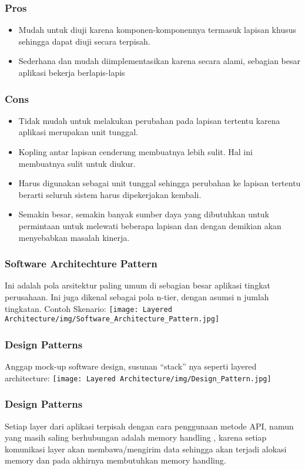 \documentclass{beamer}
\begin{document}
\begin{frame}
\frametitle{Pros}
\begin{itemize}
	\item Mudah untuk diuji karena komponen-komponennya termasuk lapisan khusus sehingga dapat diuji secara terpisah.
	\item Sederhana dan mudah diimplementasikan karena secara alami, sebagian besar aplikasi bekerja berlapis-lapis
\end{itemize}
\end{frame}

\begin{frame}
\frametitle{Cons}
\begin{itemize}
	\item Tidak mudah untuk melakukan perubahan pada lapisan tertentu karena aplikasi merupakan unit tunggal.
	\item Kopling antar lapisan cenderung membuatnya lebih sulit. Hal ini membuatnya sulit untuk diukur.
	\item Harus digunakan sebagai unit tunggal sehingga perubahan ke lapisan tertentu berarti seluruh sistem harus dipekerjakan kembali.
	\item Semakin besar, semakin banyak sumber daya yang dibutuhkan untuk permintaan untuk melewati beberapa lapisan dan dengan demikian akan menyebabkan masalah kinerja.
\end{itemize}
\end{frame}

\begin{frame}
\frametitle{Software Architechture Pattern}
Ini adalah pola arsitektur paling umum di sebagian besar aplikasi tingkat perusahaan. Ini juga dikenal sebagai pola n-tier, dengan asumsi n jumlah tingkatan. Contoh Skenario:
\texttt{[image: Layered Architecture/img/Software\_Architecture\_Pattern.jpg]}
\end{frame}

\begin{frame}
\frametitle{Design Patterns}
Anggap mock-up software design, susunan “stack” nya seperti layered architecture:
\texttt{[image: Layered Architecture/img/Design\_Pattern.jpg]}

\end{frame}

\begin{frame}
\frametitle{Design Patterns}
Setiap layer dari aplikasi terpisah dengan cara penggunaan metode API, namun yang masih saling berhubungan adalah memory handling , karena setiap komunikasi layer akan membawa/mengirim data sehingga akan terjadi alokasi memory dan pada akhirnya membutuhkan memory handling.
\end{frame}
\end{document}
